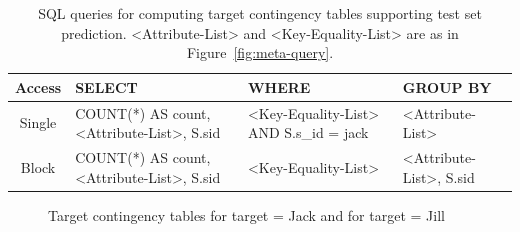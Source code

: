 \documentclass{acm_proc_article-sp}
\begin{document}
\begin{table}[t]
\caption{SQL queries for computing target contingency tables supporting test set prediction. <Attribute-List> and <Key-Equality-List> are as in Figure~\ref{fig:meta-query}.}
\begin{center}
\begin{tabular}{|c||p{6.5cm}|p{4cm}|p{5cm}}
Access &SELECT&WHERE&GROUP BY\\\hline
Single &COUNT(*) AS count, <Attribute-List>, S.sid&<Key-Equality-List> AND S.s\_id = jack& <Attribute-List>\\
\hline
Block & COUNT(*) AS count, <Attribute-List>, S.sid&<Key-Equality-List> & <Attribute-List>, S.sid\\
\end{tabular}
\end{center}
\label{table:target-query}
\end{table}%

\begin{figure}[htbp] %
 \centering
{} 
\caption{Target contingency tables for target = Jack and for target = Jill}
 \label{fig:targetc}
\end{figure}
\end{document}
